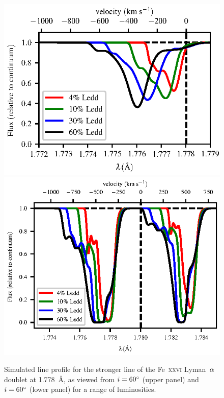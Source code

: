 \documentclass[a4paper,fleqn,usenatbib]{mnras}
\begin{document}
\begin{figure}
\includegraphics[width=\columnwidth]{figures/60_degrees_fe26.eps}
\includegraphics[width=\columnwidth]{figures/80_degrees_fe26.eps}
\caption{Simulated line profile for the stronger line of the Fe~\textsc{xxvi} Lyman~$\rm{\alpha}$
doublet at 1.778~{\AA}, as viewed from $i = 60\degree$ (upper panel) and $i = 60\degree$ 
(lower panel) for a range
of luminosities.}
\label{figure:line25}
\end{figure}



\end{document}
